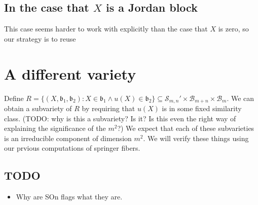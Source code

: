 \documentclass[12pt,psamsfonts]{article}
\begin{document}
\subsection{In the case that \(X\) is a Jordan block}
This case seems harder to work with explicitly than the case that \(X\) is zero, so our strategy is to reuse 


\section{A different variety}
Define \(R = \{(X, \mathfrak{b}_1, \mathfrak{b}_2) : X \in \mathfrak{b}_1 \land u(X) \in \mathfrak{b}_2\} \subseteq \mathcal{S}_{m,n}' \times \mathcal{B}_{m + n} \times \mathcal{B}_m\).
We can obtain a subvariety of \(R\) by requiring that \(u(X)\) is in some fixed similarity class.
(TODO: why is this a subvariety?  Is it?  Is this even the right way of explaining the significance of the \(m^2\)?)
We expect that each of these subvarieties is an irreducible component of dimension \(m^2\).
We will verify these things using our prvious computations of springer fibers.

\subsection{TODO}
\begin{itemize}
    \item Why are SOn flags what they are.
\end{itemize}


\end{document}
